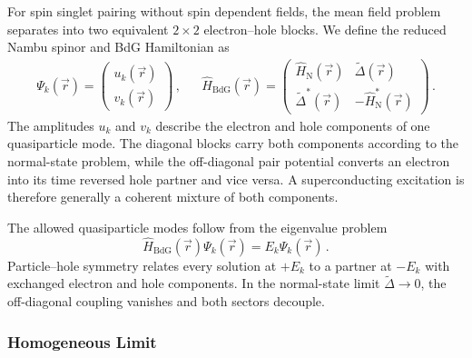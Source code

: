             For spin singlet pairing without spin dependent fields, the mean field problem separates into two equivalent $2\times2$ electron--hole blocks. We define the reduced Nambu spinor and BdG Hamiltonian as
            \begin{align}
                \Psi_k(\vec r)
                =
                \begin{pmatrix}
                    u_k(\vec r)\\
                    v_k(\vec r)
                \end{pmatrix}\,,
                &&
                \hat H_\mathrm{BdG}(\vec r)
                =
                \begin{pmatrix}
                    \hat H_\mathrm{N}(\vec r) & \widetilde{\Delta}(\vec r)\\
                    \widetilde{\Delta}^{\ast}(\vec r) & -\hat H_\mathrm{N}^\ast(\vec r)
                \end{pmatrix}\,.
                \label{eq:micro:bdg-definitions}
            \end{align}
            The amplitudes $u_k$ and $v_k$ describe the electron and hole components of one quasiparticle mode. The diagonal blocks carry both components according to the normal-state problem, while the off-diagonal pair potential converts an electron into its time reversed hole partner and vice versa. A superconducting excitation is therefore generally a coherent mixture of both components.

            The allowed quasiparticle modes follow from the eigenvalue problem
            \begin{equation}
                \hat H_\mathrm{BdG}(\vec r)\Psi_k(\vec r)
                =E_k\Psi_k(\vec r)\,.
                \label{eq:micro:bdg}
            \end{equation}
            Particle--hole symmetry relates every solution at $+E_k$ to a partner at $-E_k$ with exchanged electron and hole components. In the normal-state limit $\widetilde{\Delta}\to0$, the off-diagonal coupling vanishes and both sectors decouple. \cite{bogoljubov_new_1958,nambu_quasi-particles_1960,de_gennes_superconductivity_1966}

        \subsubsection*{Homogeneous Limit}
        \label{subsubsec:micro:homogeneous-limit}

